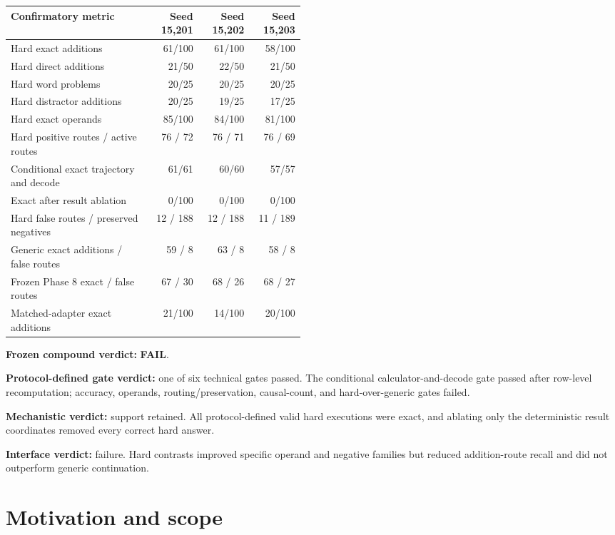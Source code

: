 \documentclass[11pt]{article}
\newcommand{\fail}{\textcolor{failred}{\textbf{FAIL}}}
\begin{document}
\begin{center}
\small
\begin{tabular}{p{0.48\linewidth}rrr}
\toprule
Confirmatory metric & Seed 15,201 & Seed 15,202 & Seed 15,203\\
\midrule
Hard exact additions & 61/100 & 61/100 & 58/100\\
Hard direct additions & 21/50 & 22/50 & 21/50\\
Hard word problems & 20/25 & 20/25 & 20/25\\
Hard distractor additions & 20/25 & 19/25 & 17/25\\
Hard exact operands & 85/100 & 84/100 & 81/100\\
Hard positive routes / active routes
  & 76 / 72 & 76 / 71 & 76 / 69\\
Conditional exact trajectory and decode
  & 61/61 & 60/60 & 57/57\\
Exact after result ablation & 0/100 & 0/100 & 0/100\\
Hard false routes / preserved negatives
  & 12 / 188 & 12 / 188 & 11 / 189\\
Generic exact additions / false routes
  & 59 / 8 & 63 / 8 & 58 / 8\\
Frozen Phase 8 exact / false routes
  & 67 / 30 & 68 / 26 & 68 / 27\\
Matched-adapter exact additions
  & 21/100 & 14/100 & 20/100\\
\bottomrule
\end{tabular}
\end{center}

\noindent\textbf{Frozen compound verdict:} \fail.

\medskip
\noindent\textbf{Protocol-defined gate verdict:} one of six technical gates
passed. The conditional calculator-and-decode gate passed after row-level
recomputation; accuracy, operands, routing/preservation, causal-count, and
hard-over-generic gates failed.

\medskip
\noindent\textbf{Mechanistic verdict:} support retained. All protocol-defined
valid hard executions were exact, and ablating only the deterministic result
coordinates removed every correct hard answer.

\medskip
\noindent\textbf{Interface verdict:} failure. Hard contrasts improved specific
operand and negative families but reduced addition-route recall and did not
outperform generic continuation.

\section{Motivation and scope}
\end{document}
